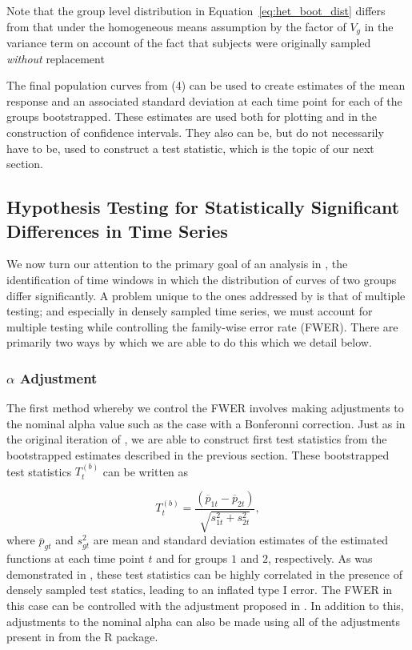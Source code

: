 Note that the group level distribution in Equation~\ref{eq:het_boot_dist} differs from that under the homogeneous means assumption by the factor of $V_g$ in the variance term on account of the fact that subjects were originally sampled \emph{without} replacement


The final population curves from (4) can be used to create estimates of the mean response and an associated standard deviation at each time point for each of the groups bootstrapped. These estimates are used both for plotting and in the construction of confidence intervals. They also can be, but do not necessarily have to be, used to construct a test statistic, which is the topic of our next section.

\subsection{Hypothesis Testing  for Statistically Significant Differences in Time Series}

We now turn our attention to the primary goal of an analysis in , the identification of time windows in which the distribution of curves of two groups differ significantly. A problem unique to the ones addressed by  is that of multiple testing; and especially in densely sampled time series, we must account for multiple testing while controlling the family-wise error rate (FWER). There are primarily two ways by which we are able to do this which we detail below.

\subsubsection{$\alpha$ Adjustment}

The first method whereby we control the FWER involves making adjustments to the nominal alpha value such as the case with a Bonferonni correction. Just as in the original iteration of , we are able to construct first test statistics from the bootstrapped estimates described in the previous section. These bootstrapped test statistics $T_t^{(b)}$ can be written as 

\begin{equation}\label{eq:test_statistic}
T_t^{(b)} = \frac{(\overline{p}_{1t} - \overline{p}_{2t})}{\sqrt{s_{1t}^2 + s_{2t}^2}},
\end{equation}
where $\overline{p}_{gt}$ and $s_{gt}^2$ are mean and standard deviation estimates  of the estimated functions at each time point $t$ and for groups $1$ and $2$, respectively. As was demonstrated in \cite{oleson2017detecting}, these test statistics can be highly correlated in the presence of densely sampled test statics, leading to an inflated type I error. The FWER in this case can be controlled with the adjustment proposed in \citet{oleson2017detecting}. In addition to this, adjustments to the nominal alpha can also be made using all of the adjustments present in  from the R  package.


